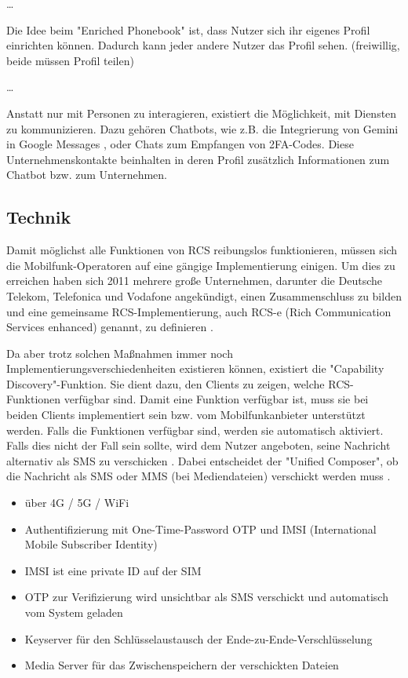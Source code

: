 \documentclass[conference]{IEEEtran}
\begin{document}
\cite{uniprof}

\dots

Die Idee beim "Enriched Phonebook" ist, dass Nutzer sich ihr eigenes Profil einrichten können.
Dadurch kann jeder andere Nutzer das Profil sehen.
(freiwillig, beide müssen Profil teilen)

\cite{rcsuite}

\dots

Anstatt nur mit Personen zu interagieren, existiert die Möglichkeit, mit Diensten zu kommunizieren. Dazu gehören Chatbots, wie z.B. die Integrierung von Gemini in Google Messages \cite{geminiinteg}, oder Chats zum Empfangen von 2FA-Codes. Diese Unternehmenskontakte beinhalten in deren Profil zusätzlich Informationen zum Chatbot bzw. zum Unternehmen.

\cite{uniprof}


\subsection{Technik}

Damit möglichst alle Funktionen von RCS reibungslos funktionieren, müssen sich die Mobilfunk-Operatoren auf eine gängige Implementierung einigen.
Um dies zu erreichen haben sich 2011 mehrere große Unternehmen, darunter die Deutsche Telekom, Telefonica und Vodafone angekündigt, einen Zusammenschluss zu bilden und eine gemeinsame RCS-Implementierung, auch RCS-e (Rich Communication Services enhanced) genannt, zu definieren \cite{rcsmno}.

Da aber trotz solchen Maßnahmen immer noch Implementierungsverschiedenheiten existieren können, existiert die "Capability Discovery"-Funktion.
Sie dient dazu, den Clients zu zeigen, welche RCS-Funktionen verfügbar sind.
Damit eine Funktion verfügbar ist, muss sie bei beiden Clients implementiert sein bzw. vom Mobilfunkanbieter unterstützt werden.
Falls die Funktionen verfügbar sind, werden sie automatisch aktiviert.
Falls dies nicht der Fall sein sollte, wird dem Nutzer angeboten, seine Nachricht alternativ als SMS zu verschicken \cite{uniprof}.
Dabei entscheidet der "Unified Composer", ob die Nachricht als SMS oder MMS (bei Mediendateien) verschickt werden muss \cite{rcsuite}.

\begin{itemize}
    \item über 4G / 5G / WiFi
    \item Authentifizierung mit One-Time-Password OTP und IMSI (International Mobile Subscriber Identity)
    \item IMSI ist eine private ID auf der SIM
    \item OTP zur Verifizierung wird unsichtbar als SMS verschickt und automatisch vom System geladen
    \item Keyserver für den Schlüsselaustausch der Ende-zu-Ende-Verschlüsselung
    \item Media Server für das Zwischenspeichern der verschickten Dateien
\end{itemize}
\cite{5gmsg}
\end{document}
